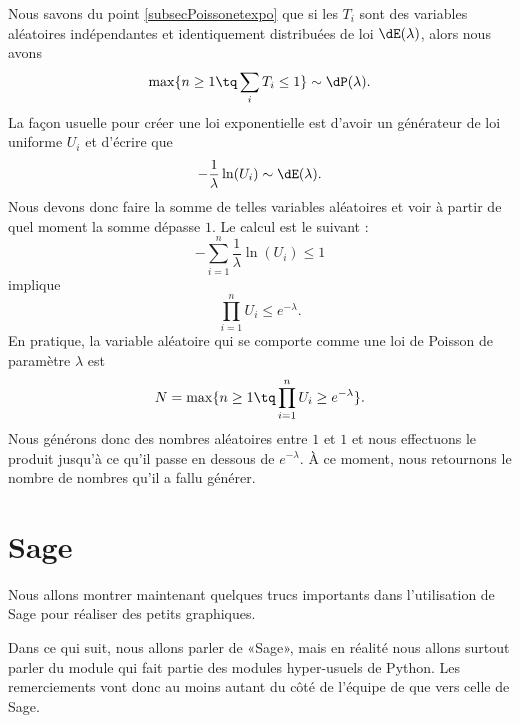 Nous savons du point \ref{subsecPoissonetexpo} que si les \( T_i\) sont des variables aléatoires indépendantes et identiquement distribuées de loi \( \dE(\lambda)\), alors nous avons
\begin{equation}
    \max\{ n\geq 1\tq\sum_iT_i\leq 1 \}\sim\dP(\lambda).
\end{equation}
La façon usuelle pour créer une loi exponentielle est d'avoir un générateur de loi uniforme \( U_i\) et d'écrire que
\begin{equation}
    -\frac{1}{ \lambda }\ln(U_i)\sim \dE(\lambda).
\end{equation}
Nous devons donc faire la somme de telles variables aléatoires et voir à partir de quel moment la somme dépasse \( 1\). Le calcul est le suivant :
\begin{equation}
    -\sum_{i=1}^{n}\frac{1}{ \lambda }\ln(U_i)\leq 1
\end{equation}
implique
\begin{equation}
    \prod_{i=1}^nU_i\leq  e^{-\lambda}.
\end{equation}
En pratique, la variable aléatoire qui se comporte comme une loi de Poisson de paramètre \( \lambda\) est
\begin{equation}
    N=\max\{ n\geq 1\tq \prod_{i=1}^nU_i\geq e^{-\lambda} \}.
\end{equation}
Nous générons donc des nombres aléatoires entre \( 1\) et \( 1\) et nous effectuons le produit jusqu'à ce qu'il passe en dessous de \(  e^{-\lambda}\). À ce moment, nous retournons le nombre de nombres qu'il a fallu générer.

\section{Sage}

Nous allons montrer maintenant quelques trucs importants dans l'utilisation de Sage pour réaliser des petits graphiques. 

\begin{remark}
    Dans ce qui suit, nous allons parler de «Sage», mais en réalité nous allons surtout parler du module  qui fait partie des modules hyper-usuels de Python. Les remerciements vont donc au moins autant du côté de l'équipe de  que vers celle de Sage.
\end{remark}

